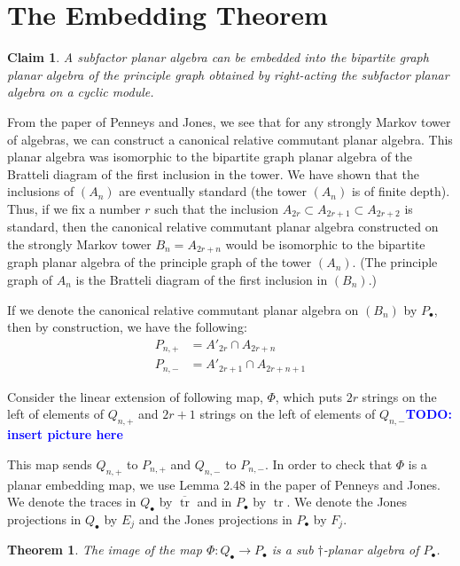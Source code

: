 \documentclass[11pt]{article}
\theoremstyle{plain}
\newtheorem{thm}{Theorem}[]
\newtheorem*{claim*}{Claim}
\theoremstyle{definition}
\DeclareMathOperator{\tr}{tr}
\newcommand{\todo}[1]{\textcolor{blue}{\textbf{TODO: #1}}}
\begin{document}
\section{The Embedding Theorem}

\begin{claim*}
A subfactor planar algebra can be embedded into the bipartite graph planar algebra of the principle graph obtained by right-acting the subfactor planar algebra on a cyclic module.
\end{claim*}
From the paper of Penneys and Jones, %
we see that for any strongly Markov tower of algebras, we can construct a canonical relative commutant planar algebra. This planar algebra was isomorphic to the bipartite graph planar algebra of the Bratteli diagram of the first inclusion in the tower. We have shown that the inclusions of $\left(A_{n}\right)$ are eventually standard (the tower $\left(A_{n}\right)$ is of finite depth). Thus, if we fix a number $r$ such that the inclusion $A_{2r} \subset A_{2r+1} \subset A_{2r+2}$ is standard, then the canonical relative commutant planar algebra constructed on the strongly Markov tower $B_{n}=A_{2r+n}$ would be isomorphic to the bipartite graph planar algebra of the principle graph of the tower $\left(A_{n}\right)$. (The principle graph of $A_{n}$ is the Bratteli diagram of the first inclusion in $\left(B_{n}\right)$.)

If we denote the canonical relative commutant planar algebra on $\left(B_{n}\right)$ by $P_{\bullet}$, then by construction, we have the following:
\begin{align*}
	P_{n,+} &=  A'_{2r}\cap A_{2r+n} \\
	P_{n,-}  &= A'_{2r+1}\cap A_{2r+n+1} 
\end{align*}

Consider the linear extension of following map, $\Phi$, which puts $2r$ strings on the left of elements of $Q_{n,+}$ and $2r+1$ strings on the left of elements of $Q_{n,-}$\todo{insert picture here} 

This map sends $Q_{n,+}$ to $P_{n,+}$ and $Q_{n,-}$ to $P_{n,-}$. In order to check that $\Phi$ is a planar embedding map, we use Lemma 2.48 in the paper of Penneys and Jones. %
We denote the traces in $Q_{\bullet}$ by $\overline{\tr}$ and in $P_{\bullet}$ by $\tr$. We denote the Jones projections in $Q_{\bullet}$ by $E_{j}$ and the Jones projections in  $P_{\bullet}$ by $F_{j}$.

\begin{thm}
The image of the map $\Phi:Q_{\bullet} \to P_{\bullet}$ is a sub $\dagger$-planar algebra of $P_{\bullet}$.
\end{thm} 
\end{document}
